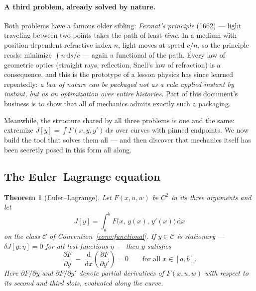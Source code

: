 \documentclass[11pt]{article}
\theoremstyle{plain}
\newtheorem{theorem}{Theorem}[section]
\theoremstyle{definition}
\theoremstyle{remark}
\newcommand{\dd}{\mathrm{d}}
\newcommand{\pd}[2]{\frac{\partial #1}{\partial #2}}
\begin{document}
\paragraph{A third problem, already solved by nature.}
Both problems have a famous older sibling: \emph{Fermat's principle}
(1662) --- light traveling between two points takes the path of least
\emph{time}. In a medium with position-dependent refractive index $n$,
light moves at speed $c/n$, so the principle reads: minimize
$\int n\,\dd s / c$ --- again a functional of the path. Every law of
geometric optics (straight rays, reflection, Snell's law of refraction)
is a consequence, and this is the prototype of a lesson physics has since
learned repeatedly: \emph{a law of nature can be packaged not as a rule
applied instant by instant, but as an optimization over entire histories.}
Part of this document's business is to show that all of mechanics admits
exactly such a packaging.

Meanwhile, the structure shared by all three problems is one and the
same: extremize $J[y] = \int F(x, y, y')\,\dd x$ over curves with pinned
endpoints. We now build the tool that solves them all --- and then
discover that mechanics itself has been secretly posed in this form all
along.

\subsection{The Euler--Lagrange equation}
\label{sec:EL}

\begin{theorem}[Euler--Lagrange]\label{thm:EL}
Let $F(x, u, w)$ be $C^2$ in its three arguments and let
\begin{equation}
  J[y] = \int_a^b F\bigl(x,\, y(x),\, y'(x)\bigr)\,\dd x
\end{equation}
on the class $\mathcal C$ of Convention~\ref{conv:functional}. If
$y \in \mathcal{C}$ is stationary --- $\delta J[y;\eta] = 0$ for all test
functions $\eta$ --- then $y$ satisfies
\begin{equation}
  \boxed{\;
  \pd{F}{y} \;-\; \frac{\dd}{\dd x}\!\left(\pd{F}{y'}\right) = 0
  \qquad\text{for all } x\in[a,b].
  \;}
  \label{eq:EL}
\end{equation}
Here $\partial F/\partial y$ and $\partial F/\partial y'$ denote partial
derivatives of $F(x,u,w)$ with respect to its second and third slots,
evaluated along the curve.
\end{theorem}
\end{document}

